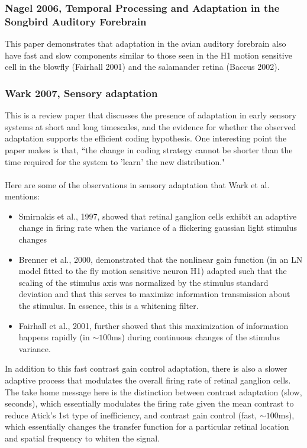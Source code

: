 \documentclass{article}
\begin{document}
\subsubsection{Nagel 2006, Temporal Processing and Adaptation in the Songbird Auditory Forebrain}
This paper demonstrates that adaptation in the avian auditory forebrain also have fast and slow components similar to those seen in the H1 motion sensitive cell in the blowfly (Fairhall 2001) and the salamander retina (Baccus 2002).

\subsubsection{Wark 2007, Sensory adaptation}
This is a review paper that discusses the presence of adaptation in early sensory systems at short and long timescales, and the evidence for whether the observed adaptation supports the efficient coding hypothesis.  One interesting point the paper makes is that, ``the change in coding strategy cannot be shorter than the time required for the system to 'learn' the new distribution."\\
\\
Here are some of the observations in sensory adaptation that Wark et al. mentions:
\begin{itemize}
\item Smirnakis et al., 1997, showed that retinal ganglion cells exhibit an adaptive change in firing rate when the variance of a flickering gaussian light stimulus changes
\item Brenner et al., 2000, demonstrated that the nonlinear gain function (in an LN model fitted to the fly motion sensitive neuron H1) adapted such that the scaling of the stimulus axis was normalized by the stimulus standard deviation and that this serves to maximize information transmission about the stimulus.  In essence, this is a whitening filter.
\item Fairhall et al., 2001, further showed that this maximization of information happens rapidly (in $\sim 100$ms) during continuous changes of the stimulus variance.
\end{itemize}
In addition to this fast contrast gain control adaptation, there is also a slower adaptive process that modulates the overall firing rate of retinal ganglion cells.  The take home message here is the distinction between contrast adaptation (slow, seconds), which essentially modulates the firing rate given the mean contrast to reduce Atick's 1st type of inefficiency, and contrast gain control (fast, $\sim 100$ms), which essentially changes the transfer function for a particular retinal location and spatial frequency to whiten the signal.
\end{document}
